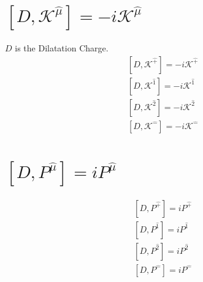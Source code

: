 \documentclass[]{article}
\numberwithin{equation}{section}
\begin{document}
\section{$\left[D, \mathcal{K}^{\hat{\mu}}\right]=-i\mathcal{K}^{\hat{\mu}}$}
$D$ is the Dilatation Charge.
\begin{align}
    &\left[D, \mathcal{K}^{\hat{+}}\right]=-i\mathcal{K}^{\hat{+}}\\
    &\left[D, \mathcal{K}^{\hat{1}}\right]=-i\mathcal{K}^{\hat{1}}\\
    &\left[D, \mathcal{K}^{\hat{2}}\right]=-i\mathcal{K}^{\hat{2}}\\
    &\left[D, \mathcal{K}^{\hat{-}}\right]=-i\mathcal{K}^{\hat{-}}
\end{align}

\section{$\left[D, P^{\hat{\mu}}\right]=iP^{\hat{\mu}}$}
\begin{align}
    &\left[D, P^{\hat{+}}\right]=iP^{\hat{+}}\\
    &\left[D, P^{\hat{1}}\right]=iP^{\hat{1}}\\
    &\left[D, P^{\hat{2}}\right]=iP^{\hat{2}}\\
    &\left[D, P^{\hat{-}}\right]=iP^{\hat{-}}
\end{align}
\end{document}
